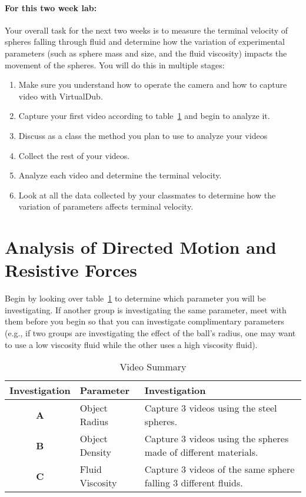 \paragraph{For this two week lab:} Your overall task for the next two weeks is to measure the terminal velocity of spheres falling through fluid and determine how the variation of experimental parameters (such as sphere mass and size, and the fluid viscosity) impacts the movement of the spheres.
You will do this in multiple stages:
\begin{enumerate}
\itemsep-0.2em
\item Make sure you understand how to operate the camera and how to capture video with VirtualDub.
\item Capture your first video according to table~\ref{tab:exp2video} and begin to analyze it.
\item Discuss as a class the method you plan to use to analyze your videos
\item Collect the rest of your videos.
\item Analyze each video and determine the terminal velocity.
\item Look at all the data collected by your classmates to determine how the variation of parameters affects terminal velocity.
\end{enumerate}

\section{Analysis of Directed Motion and Resistive Forces}
Begin by looking over table~\ref{tab:exp2video} to determine which parameter you will be investigating.
If another group is investigating the same parameter, meet with them before you begin so that you can investigate complimentary parameters (e.g., if two groups are investigating the effect of the ball's radius, one may want to use a low viscosity fluid while the other uses a high viscosity fluid).

\begin{table}[ht]
\centering
\begin{tabular}{|c|l|p{10cm}|}
\hline
 \textbf{Investigation} & \textbf{Parameter} & \textbf{Investigation} \\ \hline
 \textbf{A} & Object Radius & Capture 3 videos using the steel spheres. \\ \hline
 \textbf{B} & Object Density & Capture 3 videos using the spheres made of different materials. \\ \hline
 \textbf{C} & Fluid Viscosity & Capture 3 videos of the same sphere falling 3 different fluids. \\ \hline
\end{tabular}
\caption{Video Summary}
\label{tab:exp2video}
\end{table}

